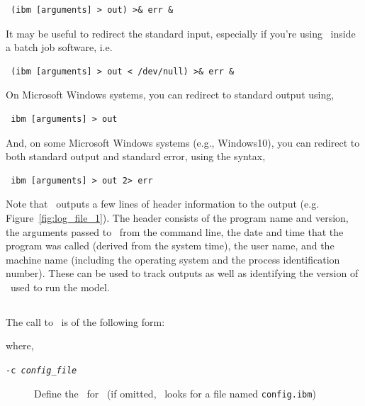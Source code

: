\begin{verbatim} (ibm [arguments] > out) >& err &\end{verbatim}

It may be useful to redirect the standard input, especially if you're using \IBM\ inside a batch job software, i.e. 

\begin{verbatim} (ibm [arguments] > out < /dev/null) >& err &\end{verbatim}

On Microsoft Windows systems, you can redirect to standard output using,

\begin{verbatim} ibm [arguments] > out\end{verbatim}

And, on some Microsoft Windows systems (e.g., Windows10), you can redirect to both standard output and standard error, using the syntax, 

\begin{verbatim} ibm [arguments] > out 2> err\end{verbatim}

Note that \IBM\ outputs a few lines of header information to the output (e.g. Figure~\ref{fig:log_file_1}). The header consists of the program name and version, the arguments passed to \IBM\ from the command line, the date and time that the program was called (derived from the system time), the user name, and the machine name (including the operating system and the process identification number). These can be used to track outputs as well as identifying the version of \IBM\ used to run the model.


\subsection{\label{sec:command-line-arguments}}

The call to \IBM\ is of the following form: 

\texttt{}

where, 

\begin{description}
  \item [\texttt{-c \emph{config\_file}}] Define the \config\ for \IBM\ (if omitted, \IBM\ looks for a file named \texttt{config.ibm})
\end{description}

